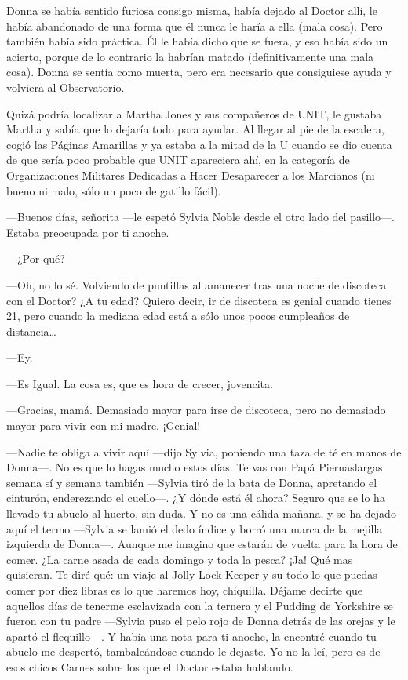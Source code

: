 Donna se había sentido furiosa consigo misma, había dejado al Doctor
allí, le había abandonado de una forma que él nunca le haría a ella
(mala cosa). Pero también había sido práctica. Él le había dicho que se
fuera, y eso había sido un acierto, porque de lo contrario la habrían
matado (definitivamente una mala cosa). Donna se sentía como muerta,
pero era necesario que consiguiese ayuda y volviera al Observatorio.

Quizá podría localizar a Martha Jones y sus compañeros de UNIT, le
gustaba Martha y sabía que lo dejaría todo para ayudar. Al llegar al pie
de la escalera, cogió las Páginas Amarillas y ya estaba a la mitad de la
U cuando se dio cuenta de que sería poco probable que UNIT apareciera
ahí, en la categoría de Organizaciones Militares Dedicadas a Hacer
Desaparecer a los Marcianos (ni bueno ni malo, sólo un poco de gatillo
fácil).

---Buenos días, señorita ---le espetó Sylvia Noble desde el otro lado
del pasillo---. Estaba preocupada por ti anoche.

---¿Por qué?

---Oh, no lo sé. Volviendo de puntillas al amanecer tras una noche de
discoteca con el Doctor? ¿A tu edad? Quiero decir, ir de discoteca es
genial cuando tienes 21, pero cuando la mediana edad está a sólo unos
pocos cumpleaños de distancia\ldots{}

---Ey.

---Es Igual. La cosa es, que es hora de crecer, jovencita.

---Gracias, mamá. Demasiado mayor para irse de discoteca, pero no
demasiado mayor para vivir con mi madre. ¡Genial!

---Nadie te obliga a vivir aquí ---dijo Sylvia, poniendo una taza de té
en manos de Donna---. No es que lo hagas mucho estos días. Te vas con
Papá Piernaslargas semana sí y semana también ---Sylvia tiró de la bata
de Donna, apretando el cinturón, enderezando el cuello---. ¿Y dónde está
él ahora? Seguro que se lo ha llevado tu abuelo al huerto, sin duda. Y
no es una cálida mañana, y se ha dejado aquí el termo ---Sylvia se lamió
el dedo índice y borró una marca de la mejilla izquierda de Donna---.
Aunque me imagino que estarán de vuelta para la hora de comer. ¿La carne
asada de cada domingo y toda la pesca? ¡Ja! Qué mas quisieran. Te diré
qué: un viaje al Jolly Lock Keeper y su todo-lo-que-puedas-comer por
diez libras es lo que haremos hoy, chiquilla. Déjame decirte que
aquellos días de tenerme esclavizada con la ternera y el Pudding de
Yorkshire se fueron con tu padre ---Sylvia puso el pelo rojo de Donna
detrás de las orejas y le apartó el flequillo---. Y había una nota para
ti anoche, la encontré cuando tu abuelo me despertó, tambaleándose
cuando le dejaste. Yo no la leí, pero es de esos chicos Carnes sobre los
que el Doctor estaba hablando.

